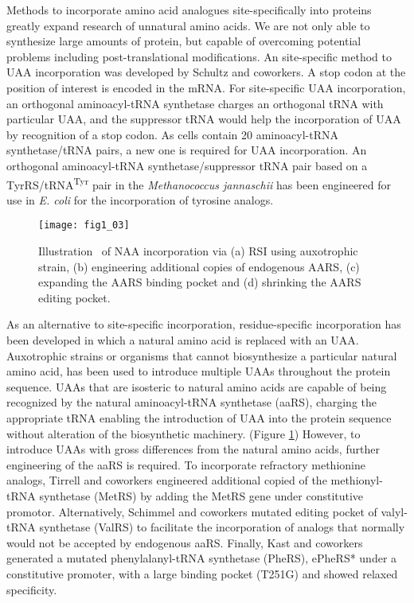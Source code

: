 \begin{refsection}
Methods to incorporate amino acid analogues site-specifically into proteins
 greatly expand research of unnatural amino acids. We are not
only able to synthesize large amounts of protein, but capable of overcoming
potential problems including post-translational modifications. An  site-specific method to UAA incorporation was developed by Schultz and
coworkers\cite{Wang2001,Wang2002}. A stop codon at the position of interest is
encoded in the mRNA. For  site-specific UAA incorporation, an
orthogonal aminoacyl-tRNA synthetase charges an orthogonal tRNA with particular
UAA, and the suppressor tRNA would help the incorporation of UAA by recognition
of a stop codon. As cells contain 20 aminoacyl-tRNA synthetase/tRNA pairs, a
new one is required for UAA incorporation. An orthogonal aminoacyl-tRNA
synthetase/suppressor tRNA pair based on a TyrRS/tRNA\textsuperscript{Tyr} pair
in the \emph{Methanococcus jannaschii} has been engineered for use in \emph{E.
coli} for the incorporation of tyrosine analogs\cite{Wang2001}.
\begin{figure}[h!] \centering \texttt{[image: fig1\_03]} 
    \caption[Illustration  of NAA incorporation via (a) RSI using auxotrophic
    strain, (b) engineering additional copies of endogenous AARS, (c) expanding
the AARS binding pocket and (d) shrinking the AARS editing
pocket.]{Illustration  of NAA incorporation via (a) RSI using auxotrophic
strain, (b) engineering additional copies of endogenous AARS, (c) expanding the
AARS binding pocket and (d) shrinking the AARS editing pocket.} \label{fig:rsi} 
\end{figure}

As an alternative to site-specific incorporation, residue-specific
incorporation has been developed in which a natural amino acid is replaced with
an UAA. Auxotrophic strains or organisms that cannot biosynthesize a particular
natural amino acid, has been used to introduce multiple UAAs throughout the
protein sequence. UAAs that are isosteric to natural amino acids are capable of
being recognized by the natural aminoacyl-tRNA synthetase (aaRS), charging the
appropriate tRNA enabling the introduction of UAA into the protein sequence
without alteration of the biosynthetic machinery. (Figure \ref{fig:rsi})
However, to introduce UAAs with gross differences from the natural amino acids,
further engineering of the aaRS is required. To incorporate refractory
methionine analogs, Tirrell and coworkers engineered additional copied of the
methionyl-tRNA synthetase (MetRS) by adding the MetRS gene under constitutive
promotor\cite{Kiick2000}.  Alternatively, Schimmel and coworkers mutated
editing pocket of valyl-tRNA synthetase (ValRS) to facilitate the incorporation
of analogs that normally would not be accepted by endogenous
aaRS\cite{Doring2001}. Finally, Kast and coworkers generated a mutated
phenylalanyl-tRNA synthetase (PheRS), ePheRS* under a constitutive promoter,
with a large binding pocket (T251G) and showed relaxed
specificity\cite{Kast1991}.


\end{refsection}
